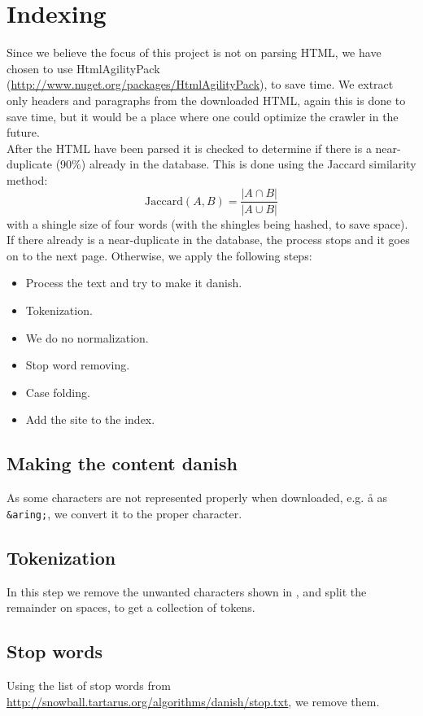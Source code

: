 \section{Indexing}
Since we believe the focus of this project is not on parsing HTML, we have chosen to use HtmlAgilityPack (\url{http://www.nuget.org/packages/HtmlAgilityPack}), to save time. We extract only headers and paragraphs from the downloaded HTML, again this is done to save time, but it would be a place where one could optimize the crawler in the future.\\

After the HTML have been parsed it is checked  to determine if there is a near-duplicate (90\%) already in the database.
This is done using the Jaccard similarity method:
\[
    \mathrm{Jaccard}(A, B) = \frac{|A \cap B|}{|A \cup B|}
\]
with a shingle size of four words (with the shingles being hashed, to save space).
If there already is a near-duplicate in the database, the process stops and it goes on to the next page.
Otherwise, we apply the following steps:

\begin{itemize}
    \item Process the text and try to make it danish.
	\item Tokenization.
    \item We do no normalization.
	\item Stop word removing.
	\item Case folding.
    \item Add the site to the index.
\end{itemize}

\subsection{Making the content danish}
As some characters are not represented properly when downloaded, e.g. å as \texttt{\&aring;}, we convert it to the proper character.

\subsection{Tokenization}
In this step we remove the unwanted characters shown in , and split the remainder on spaces, to get a collection of tokens.

\subsection{Stop words}
Using the list of stop words from \url{http://snowball.tartarus.org/algorithms/danish/stop.txt}, we remove them.

